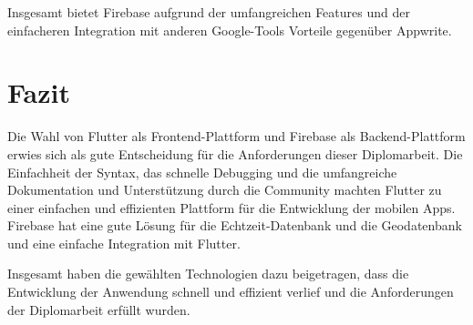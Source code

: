 Insgesamt bietet Firebase aufgrund der umfangreichen Features und der einfacheren Integration mit anderen Google-Tools Vorteile gegenüber Appwrite.


\section{Fazit}

Die Wahl von Flutter als Frontend-Plattform und Firebase als Backend-Plattform erwies sich als gute Entscheidung für die Anforderungen dieser Diplomarbeit. Die Einfachheit der Syntax, das schnelle Debugging und die umfangreiche Dokumentation und Unterstützung durch die Community machten Flutter zu einer einfachen und effizienten Plattform für die Entwicklung der mobilen Apps. Firebase hat eine gute Lösung für die Echtzeit-Datenbank und die Geodatenbank und eine einfache Integration mit Flutter.

Insgesamt haben die gewählten Technologien dazu beigetragen, dass die Entwicklung der Anwendung schnell und effizient verlief und die Anforderungen der Diplomarbeit erfüllt wurden.

